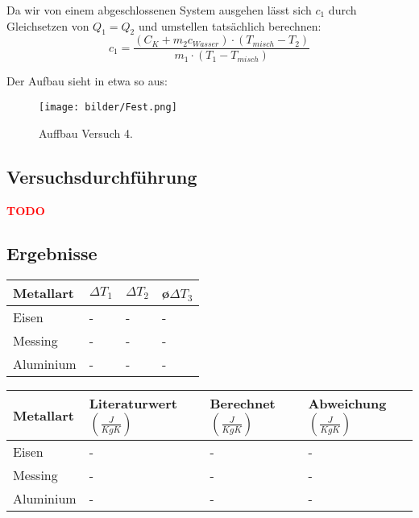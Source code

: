 	Da wir von einem abgeschlossenen System ausgehen lässt sich $c_{1}$ durch Gleichsetzen von $Q_{1} = Q_{2}$ und umstellen tatsächlich berechnen:
	$$c_{1} = \frac{(C_{K} +m_{2}c_{Wasser}) \cdot (T_{misch} - T_{2})}{m_{1} \cdot (T_{1} - T_{misch})}$$
	
	Der Aufbau sieht in etwa so aus:
	       	\begin{figure}[ht]
		\label{fig:abb4}
		\begin{center}
			\texttt{[image: bilder/Fest.png]}
			\caption{Auffbau Versuch 4.}
		\end{center}
	\end{figure}
    \subsection{Versuchsdurchführung}


    		\textbf{\textcolor{red}{TODO}}
    \subsection{Ergebnisse}



        \begin{table}[H]
            \centering
            \begin{tabular}{|l|l|l|l|}
                \hline
                Metallart & $\Delta T_{1}$ & $\Delta T_{2}$ & \o $ \Delta T_{3}$\\
                \hline
                Eisen& - & - & - \\
                \hline
                Messing & - & - & - \\
                \hline
                Aluminium& - & - & - \\
                \hline
            \end{tabular}
        \end{table}
        
        \begin{table}[H]
        	\centering
        	\begin{tabular}{|l|l|l|l|}
        		\hline
        		Metallart & Literaturwert $(\frac{J}{KgK})$ & Berechnet $(\frac{J}{KgK})$ & Abweichung $(\frac{J}{KgK})$ \\
        		\hline
        		Eisen& - & - & - \\
        		\hline
        		Messing & - & - & - \\
        		\hline
        		Aluminium& - & - & - \\
        		\hline
        	\end{tabular}
        \end{table}



